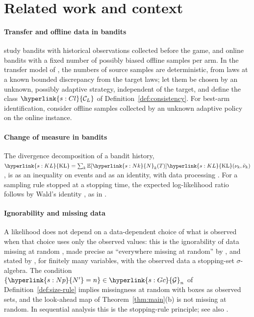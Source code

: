 \documentclass[11pt]{article}
\newcommand{\sy}[2]{\hyperlink{#1}{#2}}
\newcommand{\E}{\mathbb{E}}
\newcommand{\KL}{\sy{s:KL}{\mathrm{KL}}}
\newcommand{\Gc}{\sy{s:Gc}{\mathcal{G}}}
\newcommand{\ClL}[1][L]{\sy{s:Cl}{\mathcal{C}_{#1}}}
\newcommand{\Np}{\sy{s:Np}{N'}}
\newcommand{\Nc}{\sy{s:Nk}{N}}
\begin{document}
\section{Related work and context}\label{sec:related}

\paragraph{Transfer and offline data in bandits} \citet{SJ12} study bandits with historical
observations collected before the game, and \citet[Section~2]{CL24} online bandits with a fixed
number of possibly biased offline samples per arm. In the transfer model of
\citet[Section~3]{PMM25}, the numbers of source samples are deterministic, from laws at a known
bounded discrepancy from the target laws; \citet[Section~3.2]{PMRM26} let them be chosen by an
unknown, possibly adaptive strategy, independent of the target, and define the class $\ClL$ of
Definition~\ref{def:consistency}. For best-arm identification, \citet[Section~2]{AJSS23} consider
offline samples collected by an unknown adaptive policy on the online instance.

\paragraph{Change of measure in bandits} The divergence decomposition of a bandit history,
$\KL=\sum_k\E[\Nc_k(T)]\KL(\nu_k,\tilde\nu_k)$, is \citet[Lemma~1]{KCG16} as an inequality on
events and \citet[(8)]{GMS19} as an identity, with data processing \citep[Lemma~1]{GMS19}. For a
sampling rule stopped at a stopping time, the expected log-likelihood ratio follows by Wald's
identity \citep{W44}, as in \citet[Appendix~A, (18)]{KCG16}.

\paragraph{Ignorability and missing data} A likelihood does not depend on a data-dependent choice
of what is observed when that choice uses only the observed values: this is the ignorability of
data missing at random \citep{R76}, made precise as ``everywhere missing at random'' by
\citet[Definition~2 and Theorem~1]{SGJC13}, and stated by \citet[Theorem~1]{FDS18}, for finitely
many variables, with the observed data a stopping-set $\sigma$-algebra. The condition
$\{\Np=n\}\in\Gc_n$ of Definition~\ref{def:size-rule} implies missingness at random with boxes as
observed sets, and the look-ahead map of Theorem~\ref{thm:main}(b) is not missing at random. In
sequential analysis this is the stopping-rule principle; see also \citet{BW88}.
\end{document}
